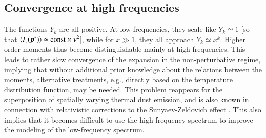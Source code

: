 \documentclass[usenatbib]{mn2e}
\begin{document}
\subsection{Convergence at high frequencies}
\label{sec:conv_GB}
The functions $Y_k$ are all positive. At low frequencies, they scale like $Y_k\simeq 1$ [so that $\left<I_\nu(\mbox{\boldmath${p}$\unboldmath}^\ast)\right>\simeq {\rm const} \times \nu^2 $], while for $x\gg 1$, they all approach $Y_k\simeq x^k$. Higher order moments thus become distinguishable mainly at high frequencies. This leads to rather slow convergence of the expansion in the non-perturbative regime, implying that without additional prior knowledge about the relations between the moments, alternative treatments, e.g., directly based on the temperature distribution function, may be needed. This problem reappears for the superposition of spatially varying thermal dust emission, and is also known in connection with relativistic corrections to the Sunyaev-Zeldovich effect \citep{Sazonov1998, Itoh98, Nozawa2006, Chluba2012SZpack}. 
%
This also implies that it becomes difficult to use the high-frequency spectrum to improve the modeling of the low-frequency spectrum.



\end{document}

